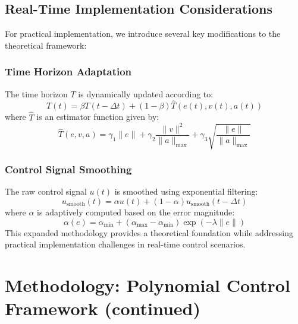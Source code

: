 \documentclass[12pt]{article}
\begin{document}
\subsection{Real-Time Implementation Considerations}
For practical implementation, we introduce several key modifications to the theoretical framework:

\subsubsection{Time Horizon Adaptation}
The time horizon $T$ is dynamically updated according to:
\begin{equation}
    T(t) = \beta T(t-\Delta t) + (1-\beta)\hat{T}(e(t), v(t), a(t))
\end{equation}
where $\hat{T}$ is an estimator function given by:
\begin{equation}
    \hat{T}(e,v,a) = \gamma_1\|e\| + \gamma_2\frac{\|v\|^2}{\|a\|_{\max}} + \gamma_3\sqrt{\frac{\|e\|}{\|a\|_{\max}}}
\end{equation}
\subsubsection{Control Signal Smoothing}
The raw control signal $u(t)$ is smoothed using exponential filtering:
\begin{equation}
    u_{\text{smooth}}(t) = \alpha u(t) + (1-\alpha)u_{\text{smooth}}(t-\Delta t)
\end{equation}
where $\alpha$ is adaptively computed based on the error magnitude:
\begin{equation}
    \alpha(e) = \alpha_{\min} + (\alpha_{\max}-\alpha_{\min})\exp(-\lambda\|e\|)
\end{equation}
This expanded methodology provides a  theoretical foundation while addressing practical implementation challenges in real-time control scenarios.


\section{Methodology: Polynomial Control Framework (continued)}
\end{document}
